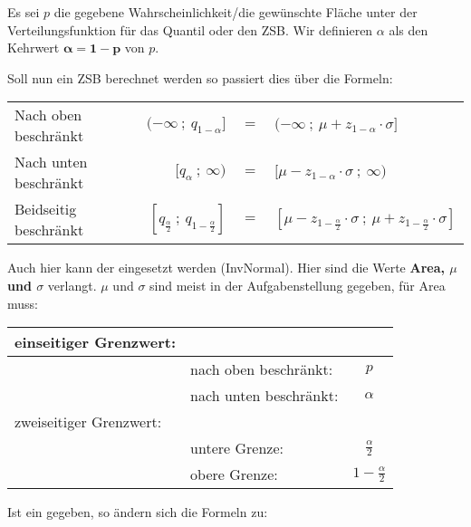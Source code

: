 \documentclass[12pt, a4paper, twoside]{scrreprt}
\begin{document}
Es sei \(p\) die gegebene Wahrscheinlichkeit/die gewünschte Fläche unter der Verteilungsfunktion für das Quantil oder den ZSB. Wir definieren \(\alpha\) als den Kehrwert \(\mathbf{\alpha = 1 - p}\) von \(p\).

Soll nun ein ZSB berechnet werden so passiert dies über die Formeln:

\begin{center}
  \begin{tabular}{lrcl}
    \toprule
    Nach oben beschränkt & \((-\infty\ ;\ q_{1-\alpha}]\) & \(=\) & \((-\infty\ ;\ \mu + z_{1-\alpha} \cdot \sigma]\)\\
    Nach unten beschränkt & \([q_{\alpha}\ ;\ \infty)\) & \(=\) & \([\mu - z_{1- \alpha} \cdot \sigma\ ;\ \infty)\)\\
    Beidseitig beschränkt & \([q_{\frac{\alpha}{2}}\ ;\ q_{1-\frac{\alpha}{2}}]\) & \(=\) & \([\mu - z_{1-\frac{\alpha}{2}} \cdot \sigma\ ;\ \mu + z_{1-\frac{\alpha}{2}} \cdot \sigma]\)\\
    \bottomrule
  \end{tabular}
\end{center}

Auch hier kann der  eingesetzt werden (InvNormal). Hier sind die Werte \textbf{Area, $\mu$ und $\sigma$} verlangt. $\mu$ und $\sigma$ sind meist in der Aufgabenstellung gegeben, für Area muss:

\begin{center}
  \begin{tabular}{llc}
    \toprule
    einseitiger Grenzwert: &&\\
    \midrule
                           & nach oben beschränkt: & \(p\)\\
                           & nach unten beschränkt: & \(\alpha\)\\
    \midrule
    zweiseitiger Grenzwert: &&\\
    \midrule
                           & untere Grenze: & \(\frac{\alpha}{2}\)\\
                           & obere Grenze: & \(1-\frac{\alpha}{2}\)\\
    \bottomrule
  \end{tabular}
\end{center}

Ist ein  gegeben, so ändern sich die Formeln zu:
\end{document}
